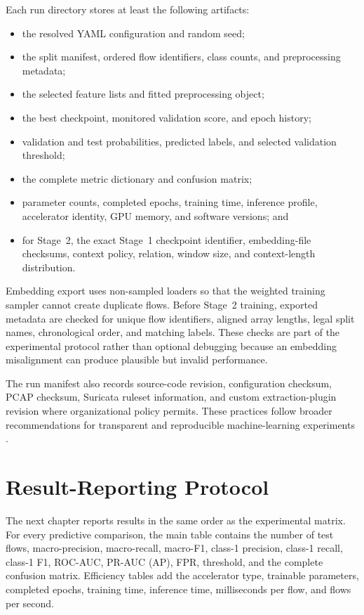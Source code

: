 Each run directory stores at least the following artifacts:
\begin{itemize}[leftmargin=*]
    \item the resolved YAML configuration and random seed;
    \item the split manifest, ordered flow identifiers, class counts, and
    preprocessing metadata;
    \item the selected feature lists and fitted preprocessing object;
    \item the best checkpoint, monitored validation score, and epoch history;
    \item validation and test probabilities, predicted labels, and selected
    validation threshold;
    \item the complete metric dictionary and confusion matrix;
    \item parameter counts, completed epochs, training time, inference
    profile, accelerator identity, GPU memory, and software versions; and
    \item for Stage~2, the exact Stage~1 checkpoint identifier, embedding-file
    checksums, context policy, relation, window size, and context-length
    distribution.
\end{itemize}

Embedding export uses non-sampled loaders so that the weighted training sampler
cannot create duplicate flows. Before Stage~2 training, exported metadata are
checked for unique flow identifiers, aligned array lengths, legal split names,
chronological order, and matching labels. These checks are part of the
experimental protocol rather than optional debugging because an embedding
misalignment can produce plausible but invalid performance.

The run manifest also records source-code revision, configuration checksum,
PCAP checksum, Suricata ruleset information, and custom extraction-plugin
revision where organizational policy permits. These practices follow broader
recommendations for transparent and reproducible machine-learning experiments
\cite{Pineau2021Reproducibility}.

\section{Result-Reporting Protocol}
\label{subsec:result_reporting_protocol}

The next chapter reports results in the same order as the experimental matrix.
For every predictive comparison, the main table contains the number of test
flows, macro-precision, macro-recall, macro-F1, class-1 precision, class-1
recall, class-1 F1, ROC-AUC, PR-AUC (AP), FPR, threshold, and the complete
confusion matrix. Efficiency tables add the accelerator type, trainable
parameters, completed epochs, training time, inference time, milliseconds per
flow, and flows per second.

